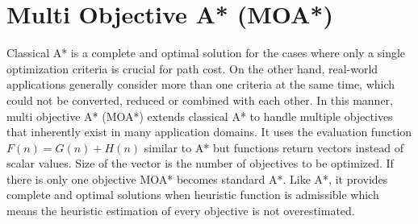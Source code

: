 \section{Multi Objective A* (MOA*)}

Classical A* \cite{AStarHart:1968} is a complete and optimal solution for the cases where only a single optimization criteria is crucial for path cost. On the other hand, real-world applications generally consider more than one criteria at the same time, which could not be converted, reduced or combined with each other. In this manner, multi objective A* (MOA*) \cite{MOAStewart:1991} extends classical A* to handle multiple objectives that inherently exist in many application domains. It uses the evaluation function $F(n) = G(n) + H(n)$ similar to A* but functions return vectors instead of scalar values. Size of the vector is the number of objectives to be optimized. If there is only one objective MOA* becomes standard A*. Like A*, it provides complete and optimal solutions when heuristic function is admissible which means the heuristic estimation of every objective is not overestimated.

